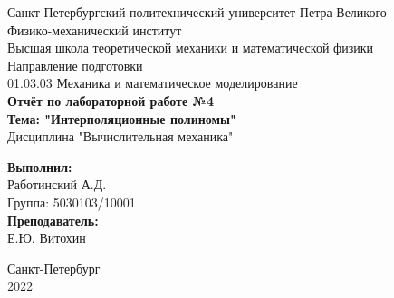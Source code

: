 \documentclass[]{article}
\begin{document}
	\begin{titlepage}
		\begin{center}
			\large Санкт-Петербургский политехнический университет Петра Великого \\
			\large Физико-механический институт \\
			\large Высшая школа теоретической механики и математической физики \\[2cm] %
			\large Направление подготовки \\
			\large 01.03.03 Механика и математическое моделирование \\[2cm]
			\LARGE \textbf {Отчёт по лабораторной работе №4} \\[0.5cm]
			\LARGE \textbf {Тема: "Интерполяционные полиномы"} \\[0.5cm]
			\large Дисциплина "Вычислительная механика" \\[4cm]
		\end{center}
		\begin{minipage}{0.25\textwidth} %
			\begin{flushright}
				\large\textbf{Выполнил:}\\
				\large Работинский А.Д. \\
				\large {Группа:} 5030103/10001 \\
				\large \textbf{Преподаватель:}\\
				\large Е.Ю. Витохин
			\end{flushright}
		\end{minipage}
		\mbox{}
		\vfill
		\begin{center}
			\large Санкт-Петербург \\
			\large 2022 
		\end{center} 
	\end{titlepage}
	\newpage
\end{document}
